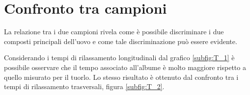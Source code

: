 \section*{Confronto tra campioni}

La relazione tra i due campioni rivela come è possibile discriminare i due composti principali dell'uovo e come tale discriminazione può essere evidente.

Considerando i tempi di rilassamento longitudinali dal grafico \ref{subfig:T_1} è possibile osservare che il tempo associato all'albume è molto maggiore rispetto a quello misurato per il tuorlo. 
Lo stesso risultato è ottenuto dal confronto tra i tempi di rilassamento trasversali, figura \ref{subfig:T_2}.

\begin{figure}[h]
\centering
{} \quad
{} \\
\caption{}
\label{fig:Confronto}
\end{figure}

